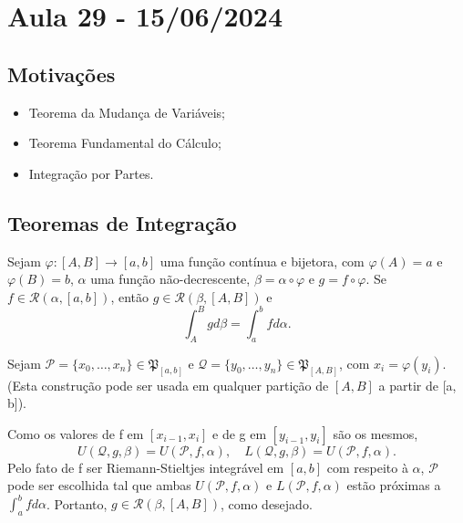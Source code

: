 \documentclass[../analysis_notes.tex]{subfiles}
\begin{document}
\section{Aula 29 - 15/06/2024}
\subsection{Motivações}
\begin{itemize}
	\item Teorema da Mudança de Variáveis;
	\item Teorema Fundamental do Cálculo;
	\item Integração por Partes.
\end{itemize}
\subsection{Teoremas de Integração}
\hypertarget{change_of_variables}{
	\begin{theorem*}
		Sejam \(\varphi :[A, B]\rightarrow [a, b]\) uma função contínua e bijetora, com \(\varphi (A)=a\) e \(\varphi (B)=b\), \(\alpha \) uma função não-decrescente, \(\beta = \alpha \circ \varphi \) e \(g = f \circ \varphi \). Se \(f\in \mathcal{R}(\alpha , [a, b])\), então \(g\in \mathcal{R}(\beta, [A, B])\) e
		\[
			\int_{A}^{B}gd\beta = \int_{a}^{b}f d\alpha .
		\]
	\end{theorem*}
}
\begin{proof*}
	Sejam \(\mathcal{P}=\{x_{0}, \dotsc , x_{n}\}\in \mathfrak{P}_{[a, b]}\) e \(\mathcal{Q}=\{y_{0}, \dotsc , y_{n}\}\in \mathfrak{P}_{[A, B]}\), com \(x_{i}=\varphi (y_{i})\). (Esta construção pode ser usada em qualquer partição de \([A, B]\) a partir de [a, b]).

	Como os valores de f em \([x_{i-1}, x_{i}]\) e de g em \([y_{i-1}, y_{i}]\) são os mesmos,
	\[
		U(\mathcal{Q}, g, \beta )=U(\mathcal{P}, f, \alpha ), \quad L(\mathcal{Q}, g, \beta )=U(\mathcal{P}, f, \alpha ).
	\]
	Pelo fato de f ser Riemann-Stieltjes integrável em \([a, b]\) com respeito à \(\alpha \), \(\mathcal{P}\) pode ser escolhida tal que ambas \(U(\mathcal{P}, f, \alpha )\) e \(L(\mathcal{P}, f, \alpha )\) estão próximas a \(\int_{a}^{b}fd\alpha \). Portanto,
	\(g\in \mathcal{R}(\beta , [A, B])\), como desejado. \qedsymbol
\end{proof*}
\end{document}
